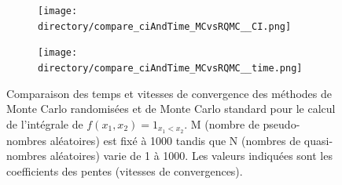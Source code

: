 \documentclass[12pt,a4paper]{report}
\def \directory {/home/jonathan/Programmation/C++/Projet_C++_S2/Images}
\begin{document}
\begin{figure}[H]
\centering
	\begin{subfigure}[scale=1]{0.45\textwidth}
			\texttt{[image: \\directory/compare\_ciAndTime\_MCvsRQMC\_\_CI.png]}
	\end{subfigure}
	\hfill
	\begin{subfigure}[scale=1]{0.45\textwidth}
		\texttt{[image: \\directory/compare\_ciAndTime\_MCvsRQMC\_\_time.png]}
	\end{subfigure}
	
\caption{\small Comparaison des temps et vitesses de convergence des méthodes de Monte Carlo randomisées et de Monte Carlo standard pour le calcul de l'intégrale de $f(x_{1},x_{2})=1_{x_{1}<x_{2}}$. M (nombre de pseudo-nombres aléatoires) est fixé à 1000 tandis que N (nombres de quasi-nombres aléatoires) varie de 1 à 1000. Les valeurs indiquées sont les coefficients des pentes (vitesses de convergences).}
\label{fig:rqmc_vitesse_convergence}
\end{figure}
\end{document}
